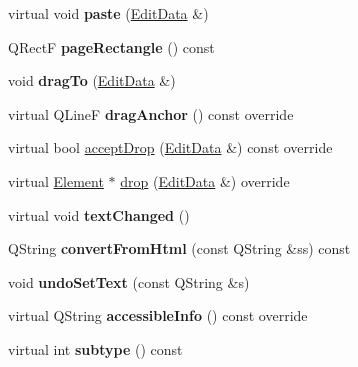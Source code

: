 \begin{DoxyCompactItemize}
virtual void {\bfseries paste} (\hyperlink{class_ms_1_1_edit_data}{Edit\+Data} \&)
\item 
\mbox{\label{class_ms_1_1_text_a21dc6495d3a180dab7eaaeabd32810b8}} 
Q\+RectF {\bfseries page\+Rectangle} () const
\item 
\mbox{\label{class_ms_1_1_text_a973cf7fecb817139d68dd7dcd16e917c}} 
void {\bfseries drag\+To} (\hyperlink{class_ms_1_1_edit_data}{Edit\+Data} \&)
\item 
\mbox{\label{class_ms_1_1_text_a4230606c170f906864aaa9b5512cce0a}} 
virtual Q\+LineF {\bfseries drag\+Anchor} () const override
\item 
virtual bool \hyperlink{class_ms_1_1_text_ad2cd890960721f25a8d4721031fa45f8}{accept\+Drop} (\hyperlink{class_ms_1_1_edit_data}{Edit\+Data} \&) const override
\item 
virtual \hyperlink{class_ms_1_1_element}{Element} $\ast$ \hyperlink{class_ms_1_1_text_a410338a533177c7f52bbd691505211a0}{drop} (\hyperlink{class_ms_1_1_edit_data}{Edit\+Data} \&) override
\item 
\mbox{\label{class_ms_1_1_text_a91aac5d5d3b89bc59fb83077aa655df1}} 
virtual void {\bfseries text\+Changed} ()
\item 
\mbox{\label{class_ms_1_1_text_ae8b4c4ed988b44dc335fe3ef8f7d5be9}} 
Q\+String {\bfseries convert\+From\+Html} (const Q\+String \&ss) const
\item 
\mbox{\label{class_ms_1_1_text_a0fbc51ebcda6a31879c457fa6ab13996}} 
void {\bfseries undo\+Set\+Text} (const Q\+String \&s)
\item 
\mbox{\label{class_ms_1_1_text_ac74d9dcb04082617ce179096da1bea6d}} 
virtual Q\+String {\bfseries accessible\+Info} () const override
\item 
\mbox{\label{class_ms_1_1_text_a5537dc96e9c405c8a9f7f85efeb54d0b}} 
virtual int {\bfseries subtype} () const
\item 
\mbox{\label{class_ms_1_1_text_aef430d4ad447f484f20b39ff6d921643}} 

\end{DoxyCompactItemize}
